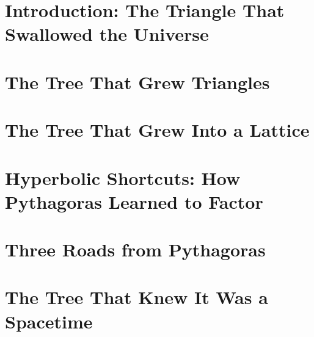 \documentclass[11pt,openright,twoside,extrafontsizes]{memoir}
\theoremstyle{definition}
\begin{document}
\renewcommand{\listfigurename}{List of Figures}
\listoffigures*
\cleardoublepage

\mainmatter

\chapter*{Introduction: The Triangle That Swallowed the Universe}


\chapter{The Tree That Grew Triangles}


\chapter{The Tree That Grew Into a Lattice}


\chapter{Hyperbolic Shortcuts: How Pythagoras Learned to Factor}


\chapter{Three Roads from Pythagoras}


\chapter{The Tree That Knew It Was a Spacetime}


\end{document}
